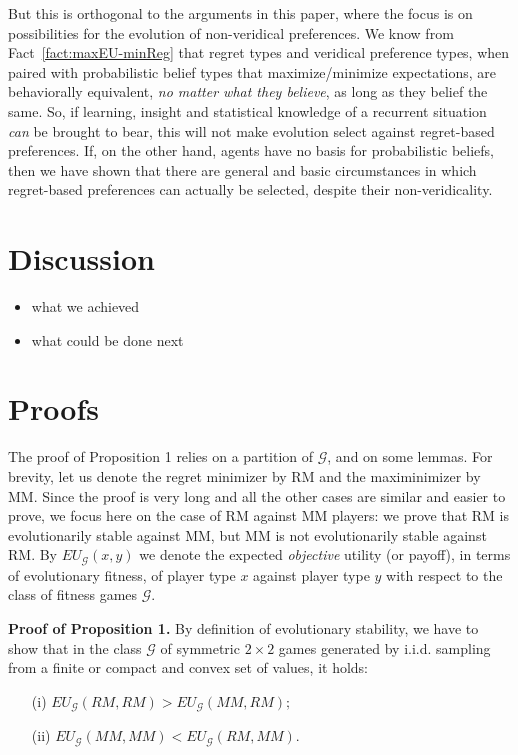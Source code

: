 \documentclass[fleqn,reqno,11pt]{article}
\begin{document}
But this is orthogonal to the arguments in this paper, where the focus is on possibilities for
the evolution of non-veridical preferences. We know from Fact~\ref{fact:maxEU-minReg} that
regret types and veridical preference types, when paired with probabilistic belief types that
maximize/minimize expectations, are behaviorally equivalent, \emph{no matter what they believe},
as long as they belief the same. So, if learning, insight and statistical knowledge of a
recurrent situation \emph{can} be brought to bear, this will not make evolution select against
regret-based preferences. If, on the other hand, agents have no basis for probabilistic
beliefs, then we have shown that there are general and basic circumstances in which
regret-based preferences can actually be selected, despite their non-veridicality.

\section{Discussion}

\begin{itemize}
\item what we achieved
\item what could be done next
\end{itemize}



\appendix


\section{Proofs}

The proof of Proposition 1 relies on a partition of $\mathcal{G}$,
and on some lemmas. For brevity, let us denote the regret minimizer
by RM and the maximinimizer by MM. Since the proof is very long and
all the other cases are similar and easier to prove, we focus here
on the case of RM against MM players: we prove that RM is evolutionarily
stable against MM, but MM is not evolutionarily stable against RM. By $EU_{\mathcal{G}}(x,y)$ we denote the expected \textit{objective} utility (or payoff), in terms
of evolutionary fitness, of player type $x$ against player type $y$
with respect to the class of fitness games $\mathcal{G}$. 

\medskip{}


\textbf{Proof of Proposition 1.} By definition of evolutionary stability, we have to
show that in the class $\mathcal{G}$ of symmetric $2\times2$ games generated by i.i.d. sampling
from a finite or compact and convex set of values, it holds:
\begin{itemize}
\item[(i)] $EU_{\mathcal{G}}(RM,RM)>EU_{\mathcal{G}}(MM,RM);$
\item[(ii)] $EU_{\mathcal{G}}(MM,MM)<EU_{\mathcal{G}}(RM,MM).$
\end{itemize}
\end{document}
